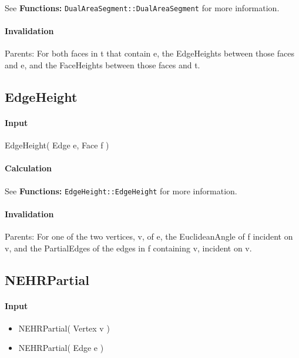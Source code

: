 See \textbf{Functions: }\texttt{DualAreaSegment::DualAreaSegment} for more
information.

\paragraph{Invalidation}

Parents: For both faces in t that contain e, the EdgeHeights between those
faces and e, and the FaceHeights between those faces and t.

\bigskip

\subsection{EdgeHeight}

\paragraph{Input}

EdgeHeight( Edge e, Face f )

\paragraph{Calculation}

See \textbf{Functions: }\texttt{EdgeHeight::EdgeHeight} for more information.

\paragraph{Invalidation}

Parents: For one of the two vertices, v, of e, the EuclideanAngle of f
incident on v, and the PartialEdges of the edges in f containing v, incident
on v.

\bigskip

\subsection{NEHRPartial}

\paragraph{Input}

\begin{itemize}
\item NEHRPartial( Vertex v )

\item NEHRPartial( Edge e )
\end{itemize}

